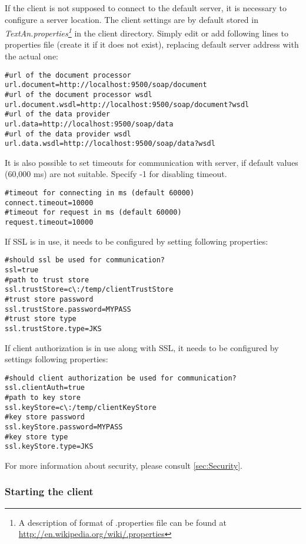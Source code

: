 If the client is not supposed to connect to the default server, it is necessary
to configure a server location. The client settings are by default stored in
\emph{TextAn.properties\footnote{A description of format of .properties file can
be found at \url{http://en.wikipedia.org/wiki/.properties}}}
in the client directory. Simply edit or add following lines to properties file
(create it if it does not exist), replacing default server address with the
actual one:
\begin{lstlisting}[frame=single,language=properties]
#url of the document processor
url.document=http://localhost:9500/soap/document
#url of the document processor wsdl
url.document.wsdl=http://localhost:9500/soap/document?wsdl
#url of the data provider
url.data=http://localhost:9500/soap/data
#url of the data provider wsdl
url.data.wsdl=http://localhost:9500/soap/data?wsdl
\end{lstlisting}

It is also possible to set timeouts for communication with server, if default
values (60,000 ms) are not suitable. Specify -1 for disabling timeout.
\begin{lstlisting}[frame=single,language=properties]
#timeout for connecting in ms (default 60000)
connect.timeout=10000
#timeout for request in ms (default 60000)
request.timeout=10000
\end{lstlisting}

If SSL is in use, it needs to be configured by setting following properties:
\begin{lstlisting}[frame=single,language=properties]
#should ssl be used for communication?
ssl=true
#path to trust store
ssl.trustStore=c\:/temp/clientTrustStore
#trust store password
ssl.trustStore.password=MYPASS
#trust store type
ssl.trustStore.type=JKS
\end{lstlisting}

If client authorization is in use along with SSL, it needs to be configured
by settings following properties:
\begin{lstlisting}[frame=single,language=properties]
#should client authorization be used for communication?
ssl.clientAuth=true
#path to key store
ssl.keyStore=c\:/temp/clientKeyStore
#key store password
ssl.keyStore.password=MYPASS
#key store type
ssl.keyStore.type=JKS
\end{lstlisting}

For more information about security, please consult \ref{sec:Security}.

\subsubsection{Starting the client}
\label{sssec:StartClient}


